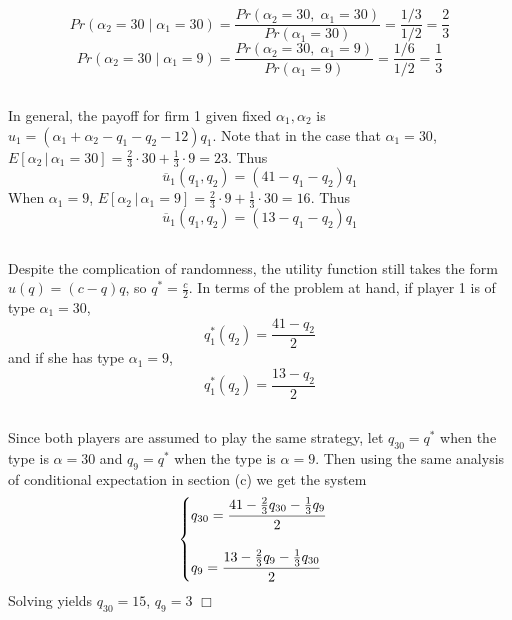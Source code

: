 \documentclass{article}
\begin{document}
\subsection{}
$$Pr(\alpha_2 = 30 \;|\; \alpha_1 = 30) = \frac{Pr(\alpha_2 = 30,\; \alpha_1 = 30)}{Pr(\alpha_1 = 30)} = \frac{1/3}{1/2} = \frac{2}{3}$$
$$Pr(\alpha_2 = 30 \;|\; \alpha_1 = 9) = \frac{Pr(\alpha_2 = 30,\; \alpha_1 = 9)}{Pr(\alpha_1 = 9)} = \frac{1/6}{1/2} = \frac{1}{3}$$

\subsection{}
In general, the payoff for firm 1 given fixed $\alpha_1,\alpha_2$ is $u_1 = (\alpha_1 + \alpha_2 - q_1 - q_2 - 12)q_1$. Note that in the case that $\alpha_1 = 30$, $E[\alpha_2 \,|\, \alpha_1 = 30] = \frac{2}{3}\cdot 30 + \frac{1}{3}\cdot 9 = 23$. Thus
$$\overline{u}_1(q_1,q_2) = (41 - q_1 - q_2)q_1$$
When $\alpha_1 = 9$, $E[\alpha_2 \,|\, \alpha_1 = 9] = \frac{2}{3}\cdot 9 + \frac{1}{3}\cdot 30 = 16$. Thus
$$\overline{u}_1(q_1,q_2) = (13 - q_1 - q_2)q_1$$

\subsection{}
Despite the complication of randomness, the utility function still takes the form $u(q) = (c - q)q$, so $q^* = \frac{c}{2}$. In terms of the problem at hand, if player 1 is of type $\alpha_1 = 30$,
$$q_1^*(q_2) = \frac{41 - q_2}{2}$$
and if she has type $\alpha_1 = 9$,
$$q_1^*(q_2) = \frac{13 - q_2}{2}$$

\subsection{}
Since both players are assumed to play the same strategy, let $q_{30} = q^*$ when the type is $\alpha = 30$ and $q_{9} = q^*$ when the type is $\alpha = 9$. Then using the same analysis of conditional expectation in section (c) we get the system
\begin{equation*}
\begin{cases}
    q_{30} = \cfrac{41 - \frac{2}{3}q_{30} - \frac{1}{3}q_{9} }{2} \\
    \\
    q_{9} = \cfrac{13 - \frac{2}{3}q_{9} - \frac{1}{3}q_{30} }{2}
\end{cases}
\end{equation*}
Solving yields $q_{30} = 15$, $q_{9} = 3$ $\Box$
\end{document}
